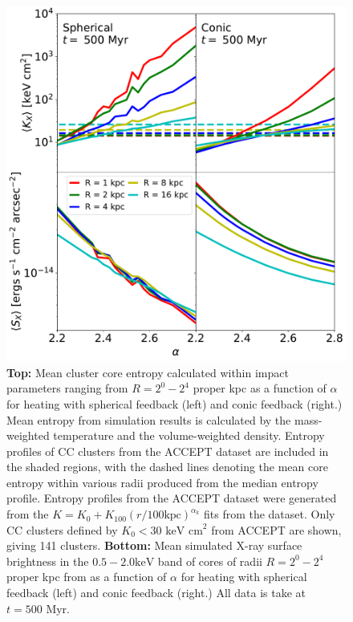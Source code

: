 \documentclass[iop,apjl, twocolappendix]{emulateapj}   %
\begin{document}
\begin{figure}
	\begin{center}
		\includegraphics[width=1\linewidth]{figures/allValpha.pdf}
	\end{center}
	\caption{
    \label{fig:allValpha}
    \textbf{Top:}  Mean cluster core entropy calculated within impact
    parameters ranging from $R = 2^0 - 2^4$ proper kpc as a function of
    $\alpha$ for heating with spherical feedback (left) and conic feedback
    (right.) Mean entropy from simulation results is calculated by the
    mass-weighted temperature and the volume-weighted density. Entropy profiles
    of CC clusters from the ACCEPT dataset are included in the shaded regions,
    with the dashed lines denoting the mean core entropy within various radii
    produced from the median entropy profile. Entropy profiles from the ACCEPT
    dataset were generated from the $K = K_0 + K_{100} \left ( r/100 \text{
      kpc} \right)^{\alpha_k}$ fits from the dataset. Only CC clusters defined
    by $K_0 < 30 \text{ keV cm}^2$ from ACCEPT are shown, giving 141 clusters.
    \textbf{Bottom:}	Mean simulated X-ray surface brightness in the $0.5 - 2.0
    \text{keV}$ band of cores of radii $R = 2^0 - 2^4$ proper kpc from as a
    function of $\alpha$ for heating with spherical feedback (left) and conic
    feedback (right.) All data is take at $t= 500 \text{ Myr}$.}
\end{figure}
\end{document}
